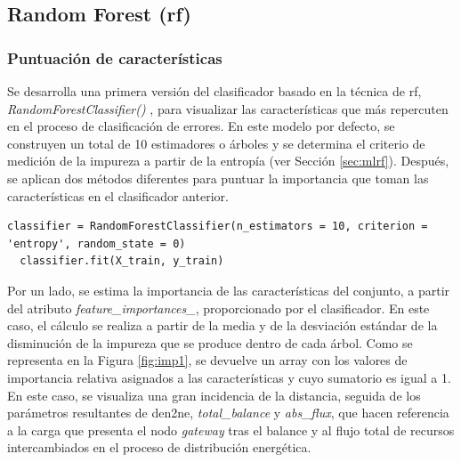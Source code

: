 \subsection{Random Forest (\acrshort{rf})}
\label{sec:rf}

\subsubsection{Puntuación de características}
\label{sec:rf1}

Se desarrolla una primera versión del clasificador basado en la técnica de \gls{rf}, \textit{RandomForestClassifier()} \cite{rfsklearn}, para visualizar las características que más repercuten en el proceso de clasificación de errores. En este modelo por defecto, se construyen un total de 10 estimadores o árboles y se determina el criterio de medición de la impureza a partir de la entropía (ver Sección \ref{sec:mlrf}). Después, se aplican dos métodos diferentes para puntuar la importancia que toman las características en el clasificador anterior. 

\vspace{3mm}

\begin{lstlisting}[style=Python, caption={Clasificador RF por defecto}]
  classifier = RandomForestClassifier(n_estimators = 10, criterion = 'entropy', random_state = 0) 
  classifier.fit(X_train, y_train)
\end{lstlisting}
  
\vspace{3mm}

Por un lado, se estima la importancia de las características del conjunto, a partir del atributo \textit{feature\_importances\_}, proporcionado por el clasificador. En este caso, el cálculo se realiza a partir de la media y de la desviación estándar de la disminución de la impureza que se produce dentro de cada árbol. Como se representa en la Figura \ref{fig:imp1}, se devuelve un array con los valores de importancia relativa asignados a las características y cuyo sumatorio es igual a 1. En este caso, se visualiza una gran incidencia de la distancia, seguida de los parámetros resultantes de \gls{den2ne}, \textit{total\_balance} y \textit{abs\_flux}, que hacen referencia a la carga que presenta el nodo \textit{gateway} tras el balance y al flujo total de recursos intercambiados en el proceso de distribución energética.

\pagebreak

